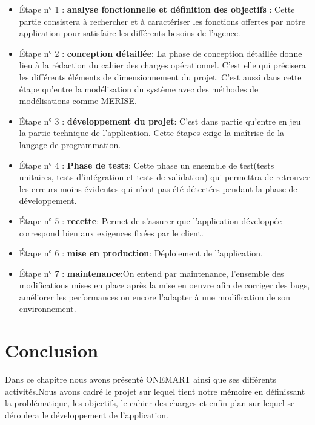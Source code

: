 	\begin{itemize}
		\item Étape n° 1 : \textbf{analyse fonctionnelle et définition des objectifs} : Cette partie consistera à rechercher et à caractériser les fonctions offertes par notre application pour satisfaire les différents besoins de l'agence.\\
		\item Étape n° 2 : \textbf{conception détaillée}: La phase de conception détaillée donne lieu à la rédaction du cahier des charges opérationnel. C'est elle qui précisera les différents éléments de dimensionnement du projet.\cite{planification} C'est aussi dans cette étape qu'entre la modélisation du système avec des méthodes de modélisations comme MERISE.\\
		\item Étape n° 3 : \textbf{développement du projet}: C'est dans partie qu'entre en jeu la partie technique de l'application. Cette étapes exige la maîtrise de la langage de programmation.\\
		\item Étape n° 4 : \textbf{Phase de tests}:
		Cette phase un ensemble de test(tests unitaires, tests d'intégration et tests de validation) qui permettra de retrouver les erreurs moins évidentes qui n'ont pas été détectées pendant la phase de développement.\\
		\item Étape n° 5 : \textbf{recette}: Permet de s'assurer que l'application développée correspond bien aux exigences fixées par le client.\\
		\item Étape n° 6 : \textbf{mise en production}: Déploiement de l'application.\\
		\item Étape n° 7 : \textbf{maintenance}:On entend par maintenance, l'ensemble des modifications mises en place après la mise en oeuvre afin de corriger des bugs, améliorer les performances ou encore l'adapter à une modification de son environnement.\cite{planification}
	\end{itemize}
	
\section{Conclusion}
	Dans ce chapitre nous avons présenté ONEMART ainsi que ses différents activités.Nous avons cadré le projet sur lequel tient notre mémoire en définissant la problématique, les objectifs, le cahier des charges et enfin plan sur lequel se déroulera le développement de l'application.